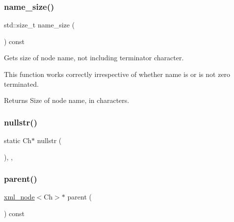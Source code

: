 \subsubsection{\texorpdfstring{name\+\_\+size()}{name\_size()}}
{\footnotesize\ttfamily std\+::size\+\_\+t name\+\_\+size (\begin{DoxyParamCaption}{ }\end{DoxyParamCaption}) const\hspace{0.3cm}{\ttfamily [inline]}}



Gets size of node name, not including terminator character. 

This function works correctly irrespective of whether name is or is not zero terminated. \begin{DoxyReturn}{Returns}
Size of node name, in characters. 
\end{DoxyReturn}
\mbox{\label{classrapidxml_1_1xml__base_a641d0b8df8e0c3c7e0db06ced0e0749f}} 
\subsubsection{\texorpdfstring{nullstr()}{nullstr()}}
{\footnotesize\ttfamily static Ch$\ast$ nullstr (\begin{DoxyParamCaption}{ }\end{DoxyParamCaption})\hspace{0.3cm}{\ttfamily [inline]}, {\ttfamily [static]}, {\ttfamily [protected]}}

\mbox{\label{classrapidxml_1_1xml__base_a7f177e162f72f65ea1f0f0188e41c1ba}} 
\subsubsection{\texorpdfstring{parent()}{parent()}}
{\footnotesize\ttfamily \mbox{\hyperlink{classrapidxml_1_1xml__node}{xml\+\_\+node}}$<$Ch$>$$\ast$ parent (\begin{DoxyParamCaption}{ }\end{DoxyParamCaption}) const\hspace{0.3cm}{\ttfamily [inline]}}



